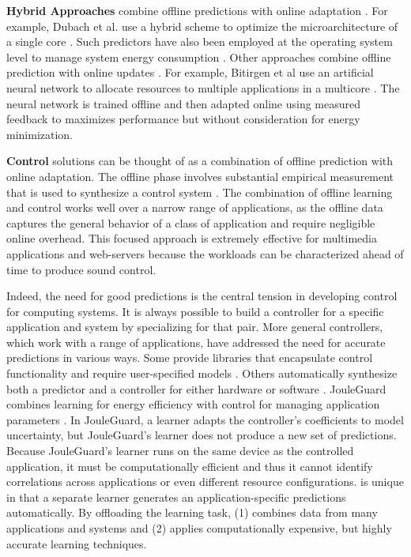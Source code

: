 \noindent \textbf{Hybrid Approaches} combine offline predictions with
online adaptation
\cite{Zhang2012,packandcap,Winter2010,dubach2010,Koala,Cinder,
  wu2012inferred}.  For example, Dubach et al.  use a hybrid scheme to
optimize the microarchitecture of a single core \cite{dubach2010}.
Such predictors have also been employed at the operating system level
to manage system energy consumption
\cite{Koala,Cinder,wu2012inferred}.  Other approaches combine offline
prediction with online updates \cite{JouleGuard,Bitirgen2008,Ipek}.
For example, Bitirgen et al use an artificial neural network to
allocate resources to multiple applications in a multicore
\cite{Bitirgen2008}.  The neural network is trained offline and then
adapted online using measured feedback to maximizes performance but
without consideration for energy minimization.


\noindent \textbf{Control} solutions can be thought of as a
combination of offline prediction with online adaptation.  The offline
phase involves substantial empirical measurement that is used to
synthesize a control system
\cite{Wu2004,Chen2011,POET,ControlWare,Agilos,Rajkumar,Sojka,Raghavendra2008}.
The combination of offline learning and control works well over a
narrow range of applications, as the offline data captures the general
behavior of a class of application and require negligible online
overhead.  This focused approach is extremely effective for multimedia
applications \cite{grace2,flinn99,flinn2004,xtune,TCST} and
web-servers \cite{Horvarth,LuEtAl-2006a,SunDaiPan-2008a} because the
workloads can be characterized ahead of time to produce sound control.

Indeed, the need for good predictions is the central tension in
developing control for computing systems.  It is always possible to
build a controller for a specific application and system by
specializing for that pair.  More general controllers, which work with
a range of applications, have addressed the need for accurate
predictions in various ways.  Some provide libraries that encapsulate
control functionality and require user-specified models
\cite{ControlWare,Sojka,Rajkumar,POET,SWiFT}.  Others automatically
synthesize both a predictor and a controller for either hardware
\cite{josep-isca2016} or software \cite{ICSE2014,FSE2015}.  JouleGuard
combines learning for energy efficiency with control for managing
application parameters \cite{JouleGuard}.  In JouleGuard, a learner
adapts the controller's coefficients to model uncertainty, but
JouleGuard's learner does not produce a new set of predictions.
Because JouleGuard's learner runs on the same device as the controlled
application, it must be computationally efficient and thus it cannot
identify correlations across applications or even different resource
configurations.  \SYSTEM{} is unique in that a separate learner
generates an application-specific predictions automatically.  By
offloading the learning task, \SYSTEM{} (1) combines data from many
applications and systems and (2) applies computationally expensive,
but highly accurate learning techniques.


